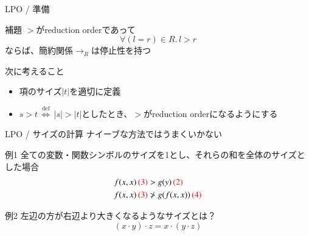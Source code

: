 \documentclass[dvipdfmx,11pt,notheorems]{beamer}
\theoremstyle{definition}
\newcommand{\red}[1]{{\color{red} #1}}
\newcommand{\defines}{\ensuremath{\overset{\text{def}}{\,\Longleftrightarrow\,}}}
\begin{document}
\begin{frame}{LPO / 準備}
  \begin{block}{補題}
  $>$がreduction orderであって
  \[
  \forall (l = r) \in R. \, l > r
  \]
  ならば、簡約関係$\rightarrow_R$は停止性を持つ
  \end{block}

  \pause
  \begin{alertblock}{次に考えること}
    \begin{itemize}
      \item 項のサイズ$|t|$を適切に定義
      \item $s > t \defines |s| > |t|$としたとき、$>$がreduction orderになるようにする
    \end{itemize}
  \end{alertblock}
\end{frame}

\begin{frame}{LPO / サイズの計算}
  ナイーブな方法ではうまくいかない
  \begin{exampleblock}{例1}
    全ての変数・関数シンボルのサイズを1とし、それらの和を全体のサイズとした場合
    \vspace{-10pt}
    \begin{align*}
      f(x, x) \, \red{(3)} &> g(y)\,\red{(2)} \\
      f(x, x) \, \red{(3)} &\not> g(f(x, x))\,\red{(4)}
    \end{align*}
  \end{exampleblock}

  \begin{exampleblock}{例2}
    左辺の方が右辺より大きくなるようなサイズとは？
    \[
    (x \cdot y) \cdot z = x \cdot (y \cdot z)
    \]
  \end{exampleblock}
\end{frame}
\end{document}
